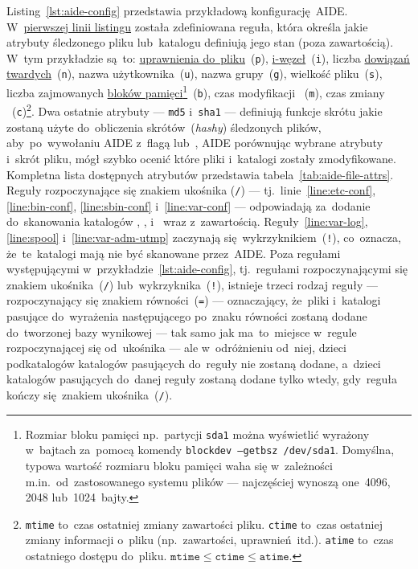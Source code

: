 \documentclass[thesis]{subfiles}
\begin{document}
Listing~\ref{lst:aide-config} przedstawia przykładową konfigurację~AIDE. W~\hyperref[line:custom-rule]{pierwszej linii listingu} została zdefiniowana reguła, która określa jakie atrybuty śledzonego pliku lub~katalogu definiują jego stan (poza zawartością). W~tym przykładzie są~to: \href{https://www.linux.com/learn/understanding-linux-file-permissions}{uprawnienia do~pliku}~(\texttt{p}), \href{https://en.wikipedia.org/wiki/Inode}{i-węzeł}~(\texttt{i}), liczba \href{https://en.wikipedia.org/wiki/Hard_link}{dowiązań twardych}~(\texttt{n}), nazwa użytkownika~(\texttt{u}), nazwa grupy~(\texttt{g}), wielkość pliku~(\texttt{s}), liczba zajmowanych \href{https://en.wikipedia.org/wiki/Block_\%28data_storage\%29}{bloków pamięci}\footnote{Rozmiar bloku pamięci np.~partycji \texttt{sda1} można wyświetlić wyrażony w~bajtach za~pomocą komendy \texttt{blockdev --getbsz /dev/sda1}. Domyślna, typowa wartość rozmiaru bloku pamięci waha się w~zależności m.in.~od~zastosowanego systemu plików --- najczęściej wynoszą one~4096, 2048 lub~1024~bajty.}~(\texttt{b}), czas modyfikacji ~(\texttt{m}), czas zmiany ~(\texttt{c})\footnote{\texttt{mtime} to~czas ostatniej zmiany zawartości pliku. \texttt{ctime} to~czas ostatniej zmiany informacji o~pliku (np.~zawartości, uprawnień~itd.). \texttt{atime} to~czas ostatniego dostępu do~pliku. $\texttt{mtime} \leq \texttt{ctime} \leq \texttt{atime}$.}. Dwa ostatnie atrybuty --- \texttt{md5} i~\texttt{sha1} --- definiują funkcje skrótu jakie zostaną użyte do~obliczenia skrótów~(\emph{hashy}) śledzonych plików, aby~po~wywołaniu AIDE z~flagą  lub~, AIDE porównując wybrane atrybuty i~skrót pliku, mógł szybko ocenić które pliki i~katalogi zostały zmodyfikowane. Kompletna lista dostępnych atrybutów przedstawia tabela~\ref{tab:aide-file-attrs}. Reguły rozpoczynające się znakiem ukośnika (\texttt{/}) --- tj.~linie~\ref{line:etc-conf}, \ref{line:bin-conf}, \ref{line:sbin-conf} i~\ref{line:var-conf} --- odpowiadają za~dodanie do~skanowania katalogów , ,  i~ wraz z~zawartością. Reguły~\ref{line:var-log}, \ref{line:spool} i~\ref{line:var-adm-utmp} zaczynają się~wykrzyknikiem~(\texttt{!}), co~oznacza, że~te~katalogi mają nie być skanowane przez~AIDE. Poza regułami występującymi w~przykładzie~\ref{lst:aide-config}, tj.~regułami rozpoczynającymi się znakiem ukośnika~(\texttt{/}) lub~wykrzyknika~(\texttt{!}), istnieje trzeci rodzaj reguły --- rozpoczynający się znakiem równości~(\texttt{=}) --- oznaczający, że~pliki i~katalogi pasujące do~wyrażenia następującego po~znaku równości zostaną dodane do~tworzonej bazy wynikowej --- tak samo jak ma~to~miejsce w~regule rozpoczynającej się od~ukośnika --- ale w~odróżnieniu od~niej, dzieci podkatalogów katalogów pasujących do~reguły nie zostaną dodane, a~dzieci katalogów pasujących do~danej reguły zostaną dodane tylko wtedy, gdy~reguła kończy się~znakiem ukośnika~(\texttt{/}).
\end{document}
